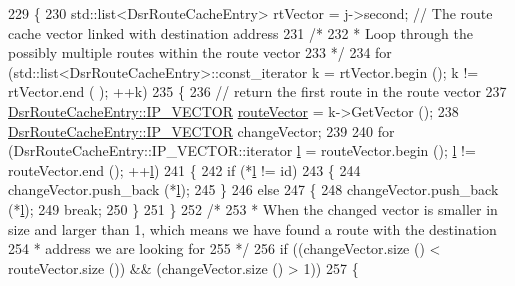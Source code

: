 \begin{DoxyCode}
229             \{
230               std::list<DsrRouteCacheEntry> rtVector = j->second; \textcolor{comment}{// The route cache vector linked with
       destination address}
231               \textcolor{comment}{/*}
232 \textcolor{comment}{               * Loop through the possibly multiple routes within the route vector}
233 \textcolor{comment}{               */}
234               \textcolor{keywordflow}{for} (std::list<DsrRouteCacheEntry>::const\_iterator k = rtVector.begin (); k != rtVector.end (
      ); ++k)
235                 \{
236                   \textcolor{comment}{// return the first route in the route vector}
237                   \hyperlink{classns3_1_1dsr_1_1DsrRouteCacheEntry_ab834177006bdbfd2e3fa607c2a88cbdf}{DsrRouteCacheEntry::IP\_VECTOR} 
      \hyperlink{classns3_1_1dsr_1_1DsrRouteCache_a055f612eb8c2e05b634db24523adb1e5}{routeVector} = k->GetVector ();
238                   \hyperlink{classns3_1_1dsr_1_1DsrRouteCacheEntry_ab834177006bdbfd2e3fa607c2a88cbdf}{DsrRouteCacheEntry::IP\_VECTOR} changeVector;
239 
240                   \textcolor{keywordflow}{for} (DsrRouteCacheEntry::IP\_VECTOR::iterator \hyperlink{buildings__pathloss_8m_a5b54c0a045f179bcbbbc9abcb8b5cd4c}{l} = routeVector.begin (); 
      \hyperlink{buildings__pathloss_8m_a5b54c0a045f179bcbbbc9abcb8b5cd4c}{l} != routeVector.end (); ++\hyperlink{buildings__pathloss_8m_a5b54c0a045f179bcbbbc9abcb8b5cd4c}{l})
241                     \{
242                       \textcolor{keywordflow}{if} (*\hyperlink{buildings__pathloss_8m_a5b54c0a045f179bcbbbc9abcb8b5cd4c}{l} != \textcolor{keywordtype}{id})
243                         \{
244                           changeVector.push\_back (*\hyperlink{buildings__pathloss_8m_a5b54c0a045f179bcbbbc9abcb8b5cd4c}{l});
245                         \}
246                       \textcolor{keywordflow}{else}
247                         \{
248                           changeVector.push\_back (*\hyperlink{buildings__pathloss_8m_a5b54c0a045f179bcbbbc9abcb8b5cd4c}{l});
249                           \textcolor{keywordflow}{break};
250                         \}
251                     \}
252                   \textcolor{comment}{/*}
253 \textcolor{comment}{                   * When the changed vector is smaller in size and larger than 1, which means we have
       found a route with the destination}
254 \textcolor{comment}{                   * address we are looking for}
255 \textcolor{comment}{                   */}
256                   \textcolor{keywordflow}{if} ((changeVector.size () < routeVector.size ())  && (changeVector.size () > 1))
257                     \{

\end{DoxyCode}
